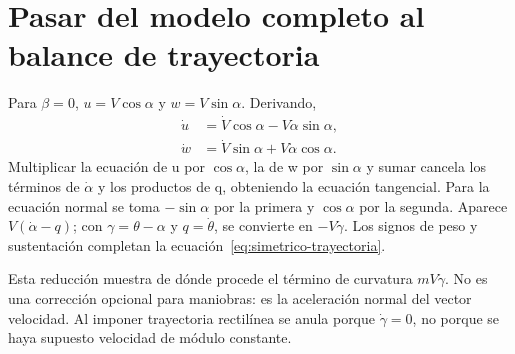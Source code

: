\section{Pasar del modelo completo al balance de trayectoria}
Para $\beta=0$, $u=V\cos\alpha$ y $w=V\sin\alpha$. Derivando,
\begin{align}
\dot u&=\dot V\cos\alpha-V\dot\alpha\sin\alpha,\\
\dot w&=\dot V\sin\alpha+V\dot\alpha\cos\alpha.
\end{align}
Multiplicar la ecuación de u por $\cos\alpha$, la de w por $\sin\alpha$ y sumar cancela los términos de $\dot\alpha$ y los productos de q, obteniendo la ecuación tangencial. Para la ecuación normal se toma $-\sin\alpha$ por la primera y $\cos\alpha$ por la segunda. Aparece $V(\dot\alpha-q)$; con $\gamma=\theta-\alpha$ y $q=\dot\theta$, se convierte en $-V\dot\gamma$. Los signos de peso y sustentación completan la ecuación~\eqref{eq:simetrico-trayectoria}.

Esta reducción muestra de dónde procede el término de curvatura $mV\dot\gamma$. No es una corrección opcional para maniobras: es la aceleración normal del vector velocidad. Al imponer trayectoria rectilínea se anula porque $\dot\gamma=0$, no porque se haya supuesto velocidad de módulo constante.
